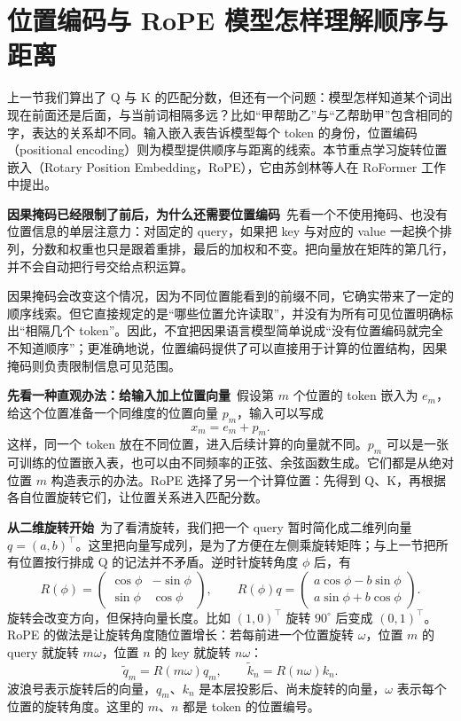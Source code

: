 \section{位置编码与 RoPE 模型怎样理解顺序与距离}\label{位置编码与RoPE}

上一节我们算出了 Q 与 K 的匹配分数，但还有一个问题：模型怎样知道某个词出现在前面还是后面，与当前词相隔多远？比如``甲帮助乙''与``乙帮助甲''包含相同的字，表达的关系却不同。输入嵌入表告诉模型每个 token 的身份，位置编码（positional encoding）则为模型提供顺序与距离的线索。本节重点学习旋转位置嵌入（Rotary Position Embedding，RoPE），它由苏剑林等人在 RoFormer 工作中提出。

\textbf{因果掩码已经限制了前后，为什么还需要位置编码}~先看一个不使用掩码、也没有位置信息的单层注意力：对固定的 query，如果把 key 与对应的 value 一起换个排列，分数和权重也只是跟着重排，最后的加权和不变。把向量放在矩阵的第几行，并不会自动把行号交给点积运算。

因果掩码会改变这个情况，因为不同位置能看到的前缀不同，它确实带来了一定的顺序线索。但它直接规定的是``哪些位置允许读取''，并没有为所有可见位置明确标出``相隔几个 token''。因此，不宜把因果语言模型简单说成``没有位置编码就完全不知道顺序''；更准确地说，位置编码提供了可以直接用于计算的位置结构，因果掩码则负责限制信息可见范围。

\textbf{先看一种直观办法：给输入加上位置向量}~假设第 \(m\) 个位置的 token 嵌入为 \(e_m\)，给这个位置准备一个同维度的位置向量 \(p_m\)，输入可以写成
\[
x_m=e_m+p_m.
\]
这样，同一个 token 放在不同位置，进入后续计算的向量就不同。\(p_m\) 可以是一张可训练的位置嵌入表，也可以由不同频率的正弦、余弦函数生成。它们都是从绝对位置 \(m\) 构造表示的办法。RoPE 选择了另一个计算位置：先得到 Q、K，再根据各自位置旋转它们，让位置关系进入匹配分数。

\textbf{从二维旋转开始}~为了看清旋转，我们把一个 query 暂时简化成二维列向量 \(q=(a,b)^{\top}\)。这里把向量写成列，是为了方便在左侧乘旋转矩阵；与上一节把所有位置按行排成 Q 的记法并不矛盾。逆时针旋转角度 \(\phi\) 后，有
\[
R(\phi)=
\begin{pmatrix}
\cos\phi & -\sin\phi\\
\sin\phi & \cos\phi
\end{pmatrix},\qquad
R(\phi)q=
\begin{pmatrix}
a\cos\phi-b\sin\phi\\
a\sin\phi+b\cos\phi
\end{pmatrix}.
\]
旋转会改变方向，但保持向量长度。比如 \((1,0)^{\top}\) 旋转 \(90^{\circ}\) 后变成 \((0,1)^{\top}\)。RoPE 的做法是让旋转角度随位置增长：若每前进一个位置旋转 \(\omega\)，位置 \(m\) 的 query 就旋转 \(m\omega\)，位置 \(n\) 的 key 就旋转 \(n\omega\)：
\[
\widetilde q_m=R(m\omega)q_m,\qquad
\widetilde k_n=R(n\omega)k_n.
\]
波浪号表示旋转后的向量，\(q_m\)、\(k_n\) 是本层投影后、尚未旋转的向量，\(\omega\) 表示每个位置的旋转角度。这里的 \(m\)、\(n\) 都是 token 的位置编号。

